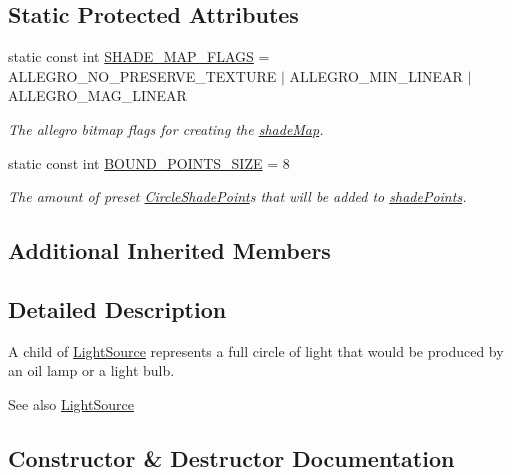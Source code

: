 \subsection*{Static Protected Attributes}
\begin{DoxyCompactItemize}
\item 
static const int \hyperlink{classlighting_1_1CircleLightSource_a92467001dc94731494055acc7465fe82}{S\+H\+A\+D\+E\+\_\+\+M\+A\+P\+\_\+\+F\+L\+A\+GS} = A\+L\+L\+E\+G\+R\+O\+\_\+\+N\+O\+\_\+\+P\+R\+E\+S\+E\+R\+V\+E\+\_\+\+T\+E\+X\+T\+U\+RE $\vert$ A\+L\+L\+E\+G\+R\+O\+\_\+\+M\+I\+N\+\_\+\+L\+I\+N\+E\+AR $\vert$ A\+L\+L\+E\+G\+R\+O\+\_\+\+M\+A\+G\+\_\+\+L\+I\+N\+E\+AR
\begin{DoxyCompactList}\small\item\em The allegro bitmap flags for creating the \hyperlink{classlighting_1_1CircleLightSource_a382414c9318853e93c85bc64bcd19f4e}{shade\+Map}. \end{DoxyCompactList}\item 
static const int \hyperlink{classlighting_1_1CircleLightSource_a87ecfd274f02278cefe416a8c48133e8}{B\+O\+U\+N\+D\+\_\+\+P\+O\+I\+N\+T\+S\+\_\+\+S\+I\+ZE} = 8
\begin{DoxyCompactList}\small\item\em The amount of preset \hyperlink{classlighting_1_1CircleShadePoint}{Circle\+Shade\+Point}s that will be added to \hyperlink{classlighting_1_1CircleLightSource_acdfea64be9d142f669338c5e206e753e}{shade\+Points}. \end{DoxyCompactList}\end{DoxyCompactItemize}
\subsection*{Additional Inherited Members}


\subsection{Detailed Description}
A child of \hyperlink{classlighting_1_1LightSource}{Light\+Source} represents a full circle of light that would be produced by an oil lamp or a light bulb. 

\begin{DoxySeeAlso}{See also}
\hyperlink{classlighting_1_1LightSource}{Light\+Source}


\end{DoxySeeAlso}


\subsection{Constructor \& Destructor Documentation}
